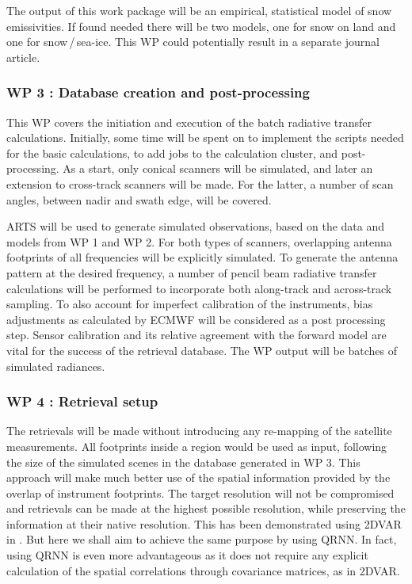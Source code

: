 \documentclass[12pt,oneside,a4paper]{article}
\begin{document}
The output of this work package will be an empirical, statistical model of
snow emissivities. If found needed there will be two models, one for snow on
land and one for snow\,/\,sea-ice. This WP could potentially result in a separate
journal article.
\vspace{-1.0ex}

\subsubsection*{WP 3 : Database creation and post-processing}
%
\label{sec:database}	
This WP covers the initiation and execution of the batch radiative
transfer calculations. Initially, some time will be spent on to implement the
scripts needed for the basic calculations, to add jobs to the calculation
cluster, and post-processing. As a start, only conical scanners will be
simulated, and later an extension to cross-track scanners will be made. For the
latter, a number of scan angles, between nadir and swath edge, will be covered.

ARTS will be used to generate simulated observations, based on the data and
models from WP 1 and WP 2. For both types of scanners, overlapping antenna
footprints of all frequencies will be explicitly simulated. To generate the
antenna pattern at the desired frequency, a number of pencil beam radiative
transfer calculations will be performed to incorporate both along-track and
across-track sampling. To also account for imperfect calibration of the
instruments, bias adjustments as calculated by ECMWF will be considered as a
post processing step. Sensor calibration and its relative agreement with the
forward model are vital for the success of the retrieval database. The WP
output will be batches of simulated radiances.  \vspace{-1.0ex}


\subsubsection*{WP 4 : Retrieval setup}
%
\label{sec:setup}
The retrievals will be made without introducing any re-mapping of the satellite
measurements. All footprints inside a region would be used as input, following
the size of the simulated scenes in the database generated in WP 3. This
approach will make much better use of the spatial information provided by the
overlap of instrument footprints. The target resolution will not be
compromised and retrievals can be made at the highest possible resolution,
while preserving the information at their native resolution. This has been
demonstrated using 2DVAR in \citet{duncan:anexp:19}. But here we shall aim to
achieve the same purpose by using QRNN. In fact, using QRNN is even more advantageous as it does not require any explicit calculation of the spatial correlations through covariance matrices, as in 2DVAR.
\end{document}
